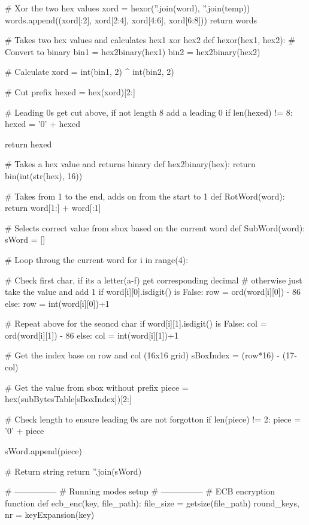\begin{python}
        # Xor the two hex values
        xord = hexor(''.join(word), ''.join(temp))
        words.append((xord[:2], xord[2:4], xord[4:6], xord[6:8]))
    return words


# Takes two hex values and calculates hex1 xor hex2
def hexor(hex1, hex2):
    # Convert to binary
    bin1 = hex2binary(hex1)
    bin2 = hex2binary(hex2)

    # Calculate
    xord = int(bin1, 2) ^ int(bin2, 2)

    # Cut prefix
    hexed = hex(xord)[2:]

    # Leading 0s get cut above, if not length 8 add a leading 0
    if len(hexed) != 8:
        hexed = '0' + hexed

    return hexed


# Takes a hex value and returns binary
def hex2binary(hex):
    return bin(int(str(hex), 16))


# Takes from 1 to the end, adds on from the start to 1
def RotWord(word):
    return word[1:] + word[:1]


# Selects correct value from sbox based on the current word
def SubWord(word):
    sWord = []

    # Loop throug the current word
    for i in range(4):

        # Check first char, if its a letter(a-f) get corresponding decimal
        # otherwise just take the value and add 1
        if word[i][0].isdigit() is False:
            row = ord(word[i][0]) - 86
        else:
            row = int(word[i][0])+1

        # Repeat above for the seoncd char
        if word[i][1].isdigit() is False:
            col = ord(word[i][1]) - 86
        else:
            col = int(word[i][1])+1

        # Get the index base on row and col (16x16 grid)
        sBoxIndex = (row*16) - (17-col)

        # Get the value from sbox without prefix
        piece = hex(subBytesTable[sBoxIndex])[2:]

        # Check length to ensure leading 0s are not forgotton
        if len(piece) != 2:
            piece = '0' + piece

        sWord.append(piece)

    # Return string
    return ''.join(sWord)


# ---------------
# Running modes setup
# ---------------
# ECB encryption function
def ecb_enc(key, file_path):
    file_size = getsize(file_path)
    round_keys, nr = keyExpansion(key)


\end{python}
